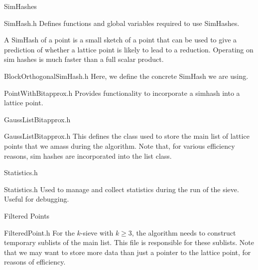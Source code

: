 \documentclass{beamer}
\begin{document}
\begin{frame}{SimHashes}
\begin{block}{SimHash.h}
Defines functions and global variables required to use SimHashes.

A SimHash of a point is a small sketch of a point that can be used to give a prediction of whether a lattice point is likely to lead to a reduction.
Operating on sim hashes is much faster than a full scalar product.
\end{block}
\begin{block}{BlockOrthogonalSimHash.h}
Here, we define the concrete SimHash we are using.
\end{block}
\begin{block}{PointWithBitapprox.h}
Provides functionality to incorporate a simhash into a lattice point.
\end{block}
\end{frame}

\begin{frame}{GaussListBitapprox.h}
\begin{block}{GaussListBitapprox.h}
This defines the class used to store the main list of lattice points that we amass during the algorithm.
Note that, for various efficiency reasons, sim hashes are incorporated into the list class.
\end{block}
\end{frame}

\begin{frame}{Statistics.h}
\begin{block}{Statistics.h}
Used to manage and collect statistics during the run of the sieve. Useful for debugging.
\end{block}
\end{frame}

\begin{frame}{Filtered Points}
\begin{block}{FilteredPoint.h}
For the $k$-sieve with $k\geq 3$, the algorithm needs to construct temporary sublists of the main list.
This file is responsible for these sublists. Note that we may want to store more data than just a pointer to the
lattice point, for reasons of efficiency.
\end{block}
\end{frame}
\end{document}
